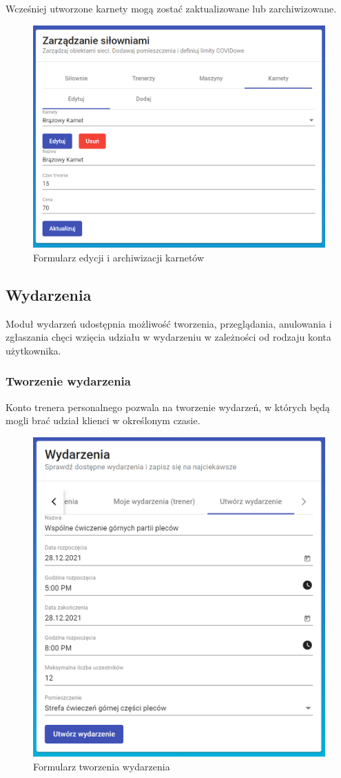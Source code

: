 \documentclass[a4paper,twoside,12pt]{book}
\begin{document}
Wcześniej utworzone karnety mogą zostać zaktualizowane lub zarchiwizowane.
\begin{figure}[h!]
	\centering
	\includegraphics[width=0.8\linewidth]{../zrzuty_ekranu/dzialanie/karnety/edycja_karnetu}
	\caption{Formularz edycji i archiwizacji karnetów}
	\label{fig:edycjakarnetu}
\end{figure}
\FloatBarrier

\subsection{Wydarzenia}
Moduł wydarzeń udostępnia możliwość tworzenia, przeglądania, anulowania i zgłaszania chęci wzięcia udziału w wydarzeniu w zależności od rodzaju konta użytkownika.
\subsubsection{Tworzenie wydarzenia}
Konto trenera personalnego pozwala na tworzenie wydarzeń, w których będą mogli brać udział klienci w określonym czasie.
\begin{figure}[h!]
	\centering
	\includegraphics[width=0.8\linewidth]{../zrzuty_ekranu/dzialanie/wydarzenia/dodawanie_wydarzenia}
	\caption{Formularz tworzenia wydarzenia}
	\label{fig:dodawaniewydarzenia}
\end{figure}
\FloatBarrier
\end{document}
